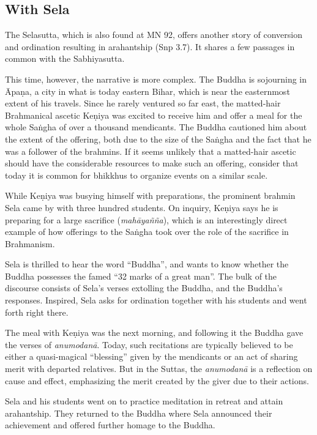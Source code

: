 \documentclass[12pt,openany]{book}%
\begin{document}
\subsection*{With Sela}

The Selasutta, which is also found at MN 92, offers another story of conversion and ordination resulting in arahantship (Snp 3.7). It shares a few passages in common with the Sabhiyasutta.

This time, however, the narrative is more complex. The Buddha is sojourning in \textsanskrit{Āpaṇa}, a city in what is today eastern Bihar, which is near the easternmost extent of his travels. Since he rarely ventured so far east, the matted-hair Brahmanical ascetic \textsanskrit{Keṇiya} was excited to receive him and offer a meal for the whole \textsanskrit{Saṅgha} of over a thousand mendicants. The Buddha cautioned him about the extent of the offering, both due to the size of the \textsanskrit{Saṅgha} and the fact that he was a follower of the brahmins. If it seems unlikely that a matted-hair ascetic should have the considerable resources to make such an offering, consider that today it is common for bhikkhus to organize events on a similar scale.

While \textsanskrit{Keṇiya} was busying himself with preparations, the prominent brahmin Sela came by with three hundred students. On inquiry, \textsanskrit{Keṇiya} says he is preparing for a large sacrifice (\textit{\textsanskrit{mahāyañña}}), which is an interestingly direct example of how offerings to the \textsanskrit{Saṅgha} took over the role of the sacrifice in Brahmanism.

Sela is thrilled to hear the word “Buddha”, and wants to know whether the Buddha possesses the famed “32 marks of a great man”. The bulk of the discourse consists of Sela’s verses extolling the Buddha, and the Buddha’s responses. Inspired, Sela asks for ordination together with his students and went forth right there.

The meal with \textsanskrit{Keṇiya} was the next morning, and following it the Buddha gave the verses of \textit{\textsanskrit{anumodanā}}. Today, such recitations are typically believed to be either a quasi-magical “blessing” given by the mendicants or an act of sharing merit with departed relatives. But in the Suttas, the \textit{\textsanskrit{anumodanā}} is a reflection on cause and effect, emphasizing the merit created by the giver due to their actions.

Sela and his students went on to practice meditation in retreat and attain arahantship. They returned to the Buddha where Sela announced their achievement and offered further homage to the Buddha.
\end{document}

